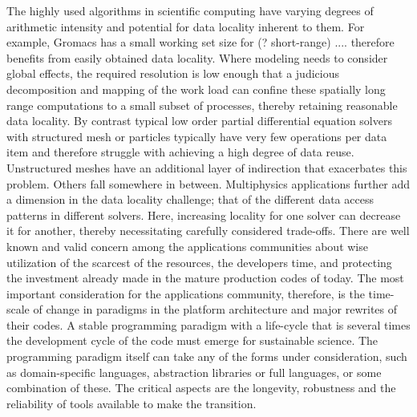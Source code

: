 The highly used algorithms in scientific computing have varying
degrees of arithmetic intensity and potential for data locality
inherent to them. For example, Gromacs has a small working set size
for (? short-range) .... therefore benefits from easily obtained data
locality. Where modeling needs to consider global effects, the
required resolution is low enough that a judicious decomposition and
mapping of the work load can confine these spatially long range
computations to a small subset of processes, thereby retaining 
reasonable data locality. By contrast typical low order partial
differential equation solvers with structured mesh or particles
typically have very few operations per data item and therefore
struggle with achieving a high degree of data reuse. Unstructured
meshes have an additional layer of indirection that exacerbates this
problem.  Others fall somewhere in between. Multiphysics applications
further add a dimension  in  the data locality challenge; that of the
different data access patterns in different solvers. Here, increasing
locality for one solver can decrease it for another, thereby
necessitating carefully considered trade-offs. There are well known
and valid concern among the applications communities about wise
utilization of the scarcest of the resources, the developers time, and
protecting the investment already made in the mature production codes
of today. The most important consideration for the applications
community, therefore, is the time-scale of change in paradigms in the
platform architecture and major rewrites of their codes. A stable
programming paradigm with a life-cycle that is several times the
development cycle of the code must emerge for sustainable science. The
programming paradigm itself can take any of the forms under
consideration, such as domain-specific languages, abstraction
libraries or full languages, or some combination of these. The
critical aspects are the longevity, robustness and the reliability of
tools available to make the transition. 
 

